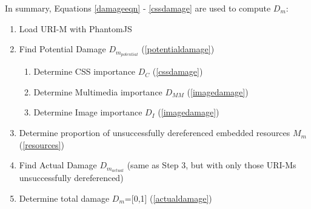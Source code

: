 


In summary, Equations \ref{damageeqn} - \ref{cssdamage} are used to compute $D_m$:

\begin{enumerate}
  \item Load URI-M with PhantomJS
  \item Find Potential Damage $D_{m_{potential}}$ (\ref{potentialdamage})
  \begin{enumerate}
	\item Determine CSS importance $D_C$ (\ref{cssdamage})
	\item Determine Multimedia importance $D_{MM}$ (\ref{imagedamage})
	\item Determine Image importance $D_I$ (\ref{imagedamage})
  \end{enumerate}
  \item Determine proportion of unsuccessfully dereferenced embedded resources $M_m$ (\ref{resources})
  \item Find Actual Damage $D_{m_{actual}}$ (same as Step 3, but with only those URI-Ms unsuccessfully dereferenced)
  \item Determine total damage $D_m$=[0,1] (\ref{actualdamage})
  \
\end{enumerate}


